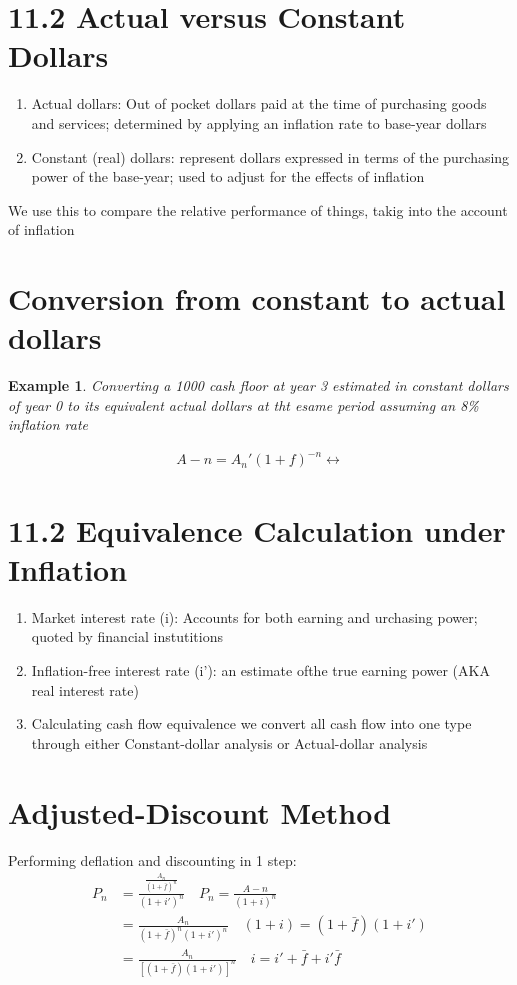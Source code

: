\documentclass{report} %
\newtheorem{exmp}{Example}
\begin{document}
\section*{11.2 Actual versus Constant Dollars}
\begin{enumerate}
    \item Actual dollars: Out of pocket dollars paid at the time of purchasing goods and services; determined by applying an inflation rate to base-year dollars
    \item Constant (real) dollars: represent dollars expressed in terms of the purchasing power of the base-year; used to adjust for the effects of inflation
\end{enumerate}
We use this to compare the relative performance of things, takig into the account of inflation

\section*{Conversion from constant to actual dollars}
\begin{exmp}
    Converting a 1000 cash floor at year 3 estimated in constant dollars of year 0 to its equivalent actual dollars at tht esame period assuming an 8\% inflation rate
\end{exmp}
\begin{equation*}
    \begin{aligned}
        A-n = A_n' (1+f)^{-n} \leftrightarrow
    \end{aligned}
\end{equation*}

\section*{11.2 Equivalence Calculation under Inflation}
\begin{enumerate}
    \item Market interest rate (i): Accounts for both earning and urchasing power; quoted by financial instutitions
    \item Inflation-free interest rate (i'): an estimate ofthe true earning power (AKA real interest rate)
    \item Calculating cash flow equivalence we convert all cash flow into one type through either Constant-dollar analysis or Actual-dollar analysis
\end{enumerate}

\section*{Adjusted-Discount Method}
Performing deflation and discounting in 1 step:
\begin{equation*}
    \begin{aligned}
        P_n &= \frac{\frac{A_n}{(1+\bar{f})^n}}{(1+i')^n} \quad P_n = \frac{A-n}{(1+i)^n}\\
        &= \frac{A_n}{(1+\bar{f})^n(1+i')^n} \quad (1+i) = (1+\bar{f})(1+i') \\
        &= \frac{A_n}{[(1+\bar{f})(1+i')]^n} \quad i = i' + \bar{f} + i'\bar{f}
    \end{aligned}
\end{equation*}
\end{document}
